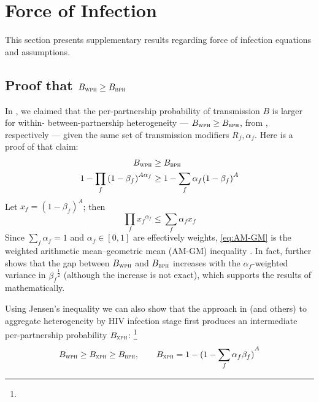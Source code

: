 \section{Force of Infection}\label{sr.foi}
This section presents supplementary results regarding
force of infection equations and assumptions.
\subsection{Proof that $B_{\textsc{wph}} \ge B_{\textsc{bph}}$}\label{sr.foi.proof}
In , we claimed that
the per-partnership probability of transmission $B$ is larger for
within- \vs between-partnership heterogeneity
--- $B_{\textsc{wph}} \ge B_{\textsc{bph}}$, from , respectively ---
given the same set of transmission modifiers $R_f, \alpha_f$.
Here is a proof of that claim:
\begin{equation}
  \begin{aligned}
    B_{\textsc{wph}} &\ge B_{\textsc{bph}} \\
    1 - \prod_f {(1 - \beta_f)}^{A\alpha_f} &\ge 1 - \sum_f \alpha_f {(1 - \beta_f)}^{A}
  \end{aligned}
\end{equation}
Let $x_f = {(1 - \beta_f)}^A$; then
\begin{equation}\label{eq:AM-GM}
  \prod_f {x_f}^{\alpha_f} \le \sum_f \alpha_f x_f
\end{equation}
Since $\sum_f \alpha_f = 1$ and $\alpha_f \in [0,1]$ are effectively weights,
\eqref{eq:AM-GM} is the weighted arithmetic mean--geometric mean (AM-GM) inequality \cite{Aldaz2009}.
In fact, \citet{Aldaz2009} further shows that the gap between $B_{\textsc{wph}}$ and $B_{\textsc{bph}}$
increases with the $\alpha_f$-weighted variance in ${\beta_f}^{\frac12}$
(although the increase is not exact),
which supports the results of  mathematically.
\par
Using Jensen's inequality \cite{Jensen1906} we can also show that
the approach in \cite{Kerr2015} (and others)
to aggregate heterogeneity by HIV infection stage first
produces an intermediate per-partnership probability $B_{\textsc{xph}}$:%
\footnote{}
\begin{equation}
  B_{\textsc{wph}} \ge B_{\textsc{xph}} \ge B_{\textsc{bph}},
  \qquad B_{\textsc{xph}} = 1 - {(1 - \sum_f \alpha_f \beta_f)}^{A}
\end{equation}
